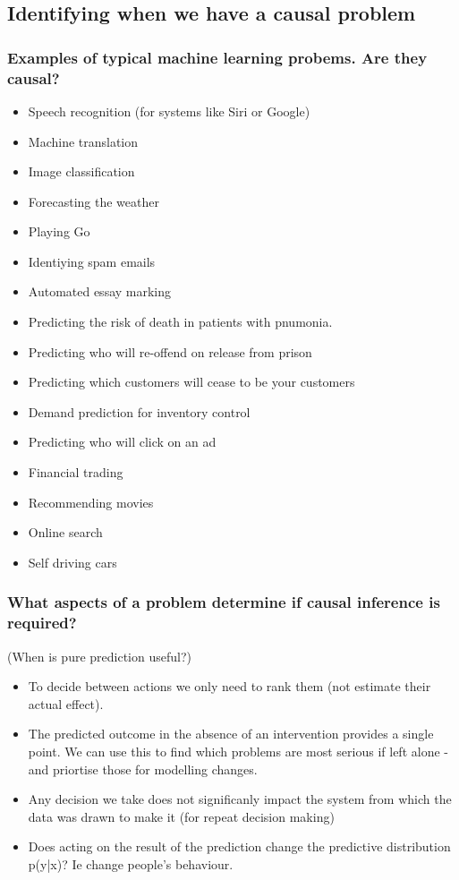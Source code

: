 \documentclass[11pt,a4paper]{book}
\begin{document}
\subsection*{Identifying when we have a causal problem}

\subsubsection*{Examples of typical machine learning probems. Are they causal?}

\begin{itemize}
\item Speech recognition (for systems like Siri or Google)
\item Machine translation 
\item Image classification
\item Forecasting the weather
\item Playing Go 
\item Identiying spam emails
\item Automated essay marking
\item Predicting the risk of death in patients with pnumonia.
\item Predicting who will re-offend on release from prison 
\item Predicting which customers will cease to be your customers
\item Demand prediction for inventory control
\item Predicting who will click on an ad
\item Financial trading
\item Recommending movies
\item Online search
\item Self driving cars
\end{itemize}

\subsubsection*{What aspects of a problem determine if causal inference is required?}
(When is pure prediction useful?)
\begin{itemize}
\item To decide between actions we only need to rank them (not estimate their actual effect). 
\item The predicted outcome in the absence of an intervention provides a single point. We can use this to find which problems are most serious if left alone - and priortise those for modelling changes. 
\item Any decision we take does not significanly impact the system from which the data was drawn to make it (for repeat decision making)
\item Does acting on the result of the prediction change the predictive distribution p(y|x)? Ie change people's behaviour.

\end{itemize}
\end{document}
